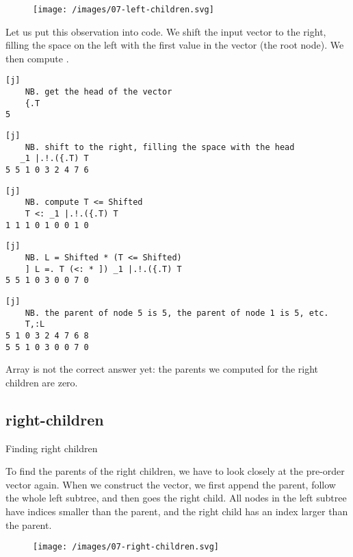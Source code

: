 \documentclass{article}
\begin{document}
\begin{figure}[grayscale-diagram]
  \texttt{[image: /images/07-left-children.svg]}
\end{figure}

Let us put this observation into code.
We shift the input vector to the right, filling the space on the left with the first value in the vector (the root node).
We then compute .

\begin{verbatim}[j]
    NB. get the head of the vector
    {.T
5
\end{verbatim}

\begin{verbatim}[j]
    NB. shift to the right, filling the space with the head
   _1 |.!.({.T) T
5 5 1 0 3 2 4 7 6
\end{verbatim}

\begin{verbatim}[j]
    NB. compute T <= Shifted
    T <: _1 |.!.({.T) T
1 1 1 0 1 0 0 1 0
\end{verbatim}
\begin{verbatim}[j]
    NB. L = Shifted * (T <= Shifted)
    ] L =. T (<: * ]) _1 |.!.({.T) T
5 5 1 0 3 0 0 7 0
\end{verbatim}
\begin{verbatim}[j]
    NB. the parent of node 5 is 5, the parent of node 1 is 5, etc.
    T,:L
5 1 0 3 2 4 7 6 8
5 5 1 0 3 0 0 7 0
\end{verbatim}

Array  is not the correct answer yet: the parents we computed for the right children are zero.

\subsection{right-children}{Finding right children}

To find the parents of the right children, we have to look closely at the pre-order vector again.
When we construct the vector, we first append the parent, follow the whole left subtree, and then goes the right child.
All nodes in the left subtree have indices smaller than the parent, and the right child has an index larger than the parent.

\begin{figure}[grayscale-diagram]
  \texttt{[image: /images/07-right-children.svg]}
\end{figure}
\end{document}
